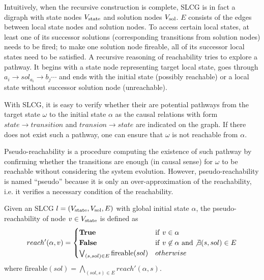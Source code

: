 Intuitively, when the recursive construction is complete, SLCG is in fact a digraph with state nodes $V_{\mathrm{state}}$ and solution nodes $V_{\mathrm{sol}}$. 
$E$ consists of the edges between local state nodes and solution nodes. 
To access certain local states, at least one of its successor solutions (corresponding transitions from solution nodes) needs to be fired; to make one solution node fireable, all of its successor local states need to be satisfied. 
A recursive reasoning of reachability tries to explore a pathway.
It begins with a state node representing target local state, goes through $a_i\to sol_{a_i}\to b_j \cdots$ and ends with the initial state (possibly reachable) or a local state without successor solution node (unreachable). 

With SLCG, it is easy to verify whether their are potential pathways from the target state $\omega$ to the initial state $\alpha$ as the causal relations with form $state\to transition$ and $transion\to state$ are indicated on the graph.
If there does not exist such a pathway, one can ensure that $\omega$ is not reachable from $\alpha$.

Pseudo-reachability is a procedure computing the existence of such pathway by confirming whether the transitions are enough (in causal sense) for $\omega$ to be reachable without considering the system evolution.
However, pseudo-reachability is named ``pseudo'' because it is only an over-approximation of the reachability, i.e. it verifies a necessary condition of the reachability.

\begin{definition}\label{defPseudoReach}
Given an SLCG $l=(V_{\mathrm{state}},V_{\mathrm{sol}},E)$ with global initial state $\alpha$, the pseudo-reachability of node $v\in V_{\mathrm{state}}$ is defined as
\begin{equation}
\nonumber
    reach'(\alpha,v)=
    \begin{cases}
        \mathrm{\bf True} & {\rm if\ } v\in \alpha\\
        \mathrm{\bf False} & {\rm if\ } v\not\in \alpha\ {\rm and} \not\exists(s,sol) \in E\\
        \bigvee_{(s,sol) \in E} \mathrm{fireable}(sol) & otherwise
    \end{cases}
\end{equation}
where $\mathrm{fireable}(sol)=\bigwedge_{(sol,s)\in E} reach'(\alpha,s)$. 

\end{definition}

